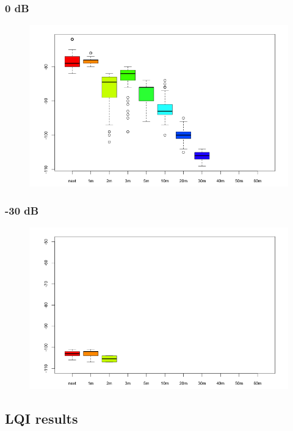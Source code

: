 \subsubsection{0 dB}

\begin{figure}[H]
  \centering
  \includegraphics[width=1.0\textwidth]{img/tests/rssi/db_00.png}
\end{figure}

\subsubsection{-30 dB}

\begin{figure}[H]
  \centering
  \includegraphics[width=1.0\textwidth]{img/tests/rssi/db_m30.png}
\end{figure}

\subsection{LQI results}

